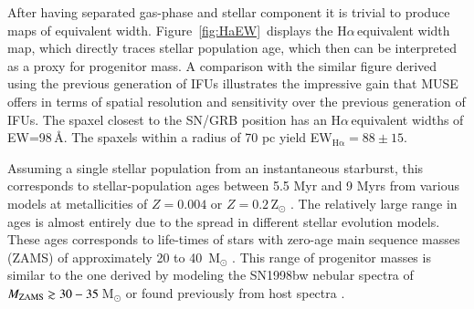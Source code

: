 \documentclass[traditabstract]{aa}
\newcommand{\ha}{H$\alpha$}
\begin{document}
After having separated gas-phase and stellar component it is trivial to produce maps of equivalent width. Figure~\ref{fig:HaEW}~displays the \ha\,equivalent width map, which directly traces stellar population age, which then can be interpreted as a proxy for progenitor mass. A comparison with the similar figure derived using the previous generation of IFUs \citep[Figure 4 in][]{2008A&A...490...45C} illustrates the impressive gain that MUSE offers in terms of spatial resolution and sensitivity over the previous generation of IFUs. The spaxel closest to the SN/GRB position has an \ha\,equivalent widths of EW=98\,\AA. The spaxels within a radius of 70 pc yield EW$_{\mathrm{H\alpha}}=88\pm15$. 

Assuming a single stellar population from an instantaneous starburst, this corresponds to stellar-population ages between 5.5 Myr and 9 Myrs from various models at metallicities of $Z=0.004$ or $Z=0.2$\,Z$_{\odot}$ \citep[see e.g.,][and references therein]{2016arXiv160703446K}. The relatively large range in ages is almost entirely due to the spread in different stellar evolution models. These ages corresponds to life-times of stars with zero-age main sequence masses (ZAMS) of approximately 20 to 40~M$_{\odot}$ \citep{1994A&AS..105...29F, 2005A&A...429..581M}. This range of progenitor masses is similar to the one derived by modeling the SN1998bw nebular spectra of $M_{\rm{ZAMS}} \gtrsim 30-35$\,M$_{\odot}$ \citep{2006ApJ...640..854M} or found previously from host spectra \citep{2005NewA...11..103S}.
\end{document}
